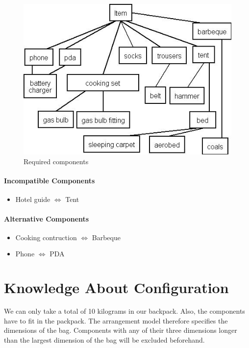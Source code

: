 \documentclass[a4paper,11pt]{article}
\begin{document}
\begin{figure}
\begin{center}
\includegraphics{subcomponents.jpg}
\end{center}
\caption{Required components}
\label{figuur:RequiredComponents}
\end{figure}

\paragraph{Incompatible Components}

\begin{itemize}
\item Hotel guide $\Leftrightarrow$ Tent
\end{itemize}

\paragraph{Alternative Components}

\begin{itemize}
\item Cooking contruction $\Leftrightarrow$ Barbeque
\item Phone $\Leftrightarrow$ PDA
\end{itemize}


\section{Knowledge About Configuration}

We can only take a total of 10 kilograms in our backpack.
Also, the components have to fit in the packpack.
The arrangement model therefore specifies the dimensions of the bag. 
Components with any of their three dimensions longer than the largest dimension 
of the bag will be excluded beforehand.
\end{document}

